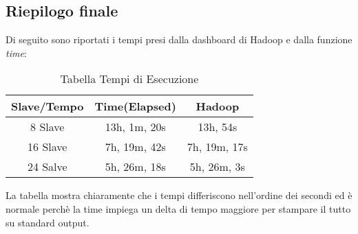 \subsection{Riepilogo finale}
Di seguito sono riportati i tempi presi dalla dashboard di Hadoop e dalla funzione \textit{time}:
\begin{table}
	\begin{center}
		\begin{tabular}{|c|c|c|}
			\hline
			Slave/Tempo & Time(Elapsed) & Hadoop       \\
			\hline
			8 Slave     & 13h, 1m, 20s  & 13h, 54s     \\
			\hline
			16 Slave    & 7h, 19m, 42s  & 7h, 19m, 17s \\
			\hline
			24 Salve    & 5h, 26m, 18s  & 5h, 26m, 3s  \\
			\hline
		\end{tabular}
		\caption{Tabella Tempi di Esecuzione}
	\end{center}
\end{table}
La tabella mostra chiaramente che i tempi differiscono nell'ordine dei secondi ed è normale perchè la time impiega un delta di tempo maggiore per stampare il tutto su standard output.